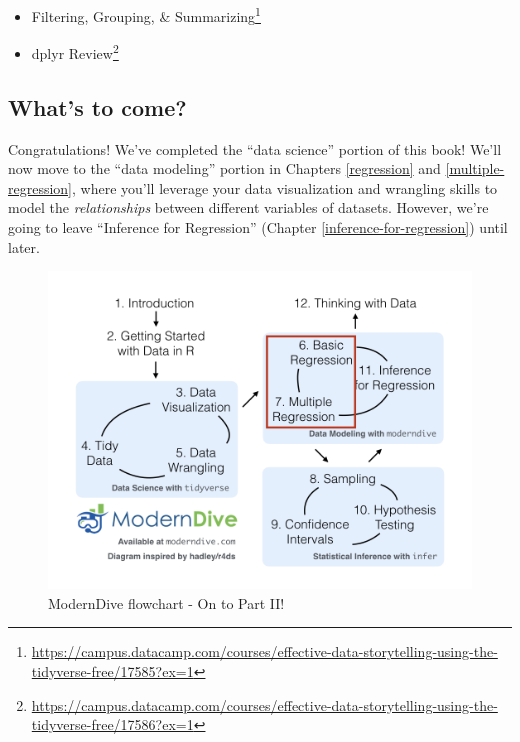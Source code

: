 \documentclass[12pt,]{krantz}
\providecommand{\tightlist}{%
  \setlength{\itemsep}{0pt}\setlength{\parskip}{0pt}}
\renewcommand{\href}[2]{#2\footnote{\url{#1}}}
\begin{document}
\begin{itemize}
\tightlist
\item
  \href{https://campus.datacamp.com/courses/effective-data-storytelling-using-the-tidyverse-free/17585?ex=1}{Filtering,
  Grouping, \& Summarizing}
\item
  \href{https://campus.datacamp.com/courses/effective-data-storytelling-using-the-tidyverse-free/17586?ex=1}{dplyr
  Review}
\end{itemize}

\subsection{What's to come?}\label{whats-to-come-3}

Congratulations! We've completed the ``data science'' portion of this
book! We'll now move to the ``data modeling'' portion in Chapters
\ref{regression} and \ref{multiple-regression}, where you'll leverage
your data visualization and wrangling skills to model the
\emph{relationships} between different variables of datasets. However,
we're going to leave ``Inference for Regression'' (Chapter
\ref{inference-for-regression}) until later.

\begin{figure}

{\centering \includegraphics[width=\textwidth]{images/flowcharts/flowchart/flowchart.005} 

}

\caption{ModernDive flowchart - On to Part II!}\label{fig:unnamed-chunk-158}
\end{figure}
\end{document}
